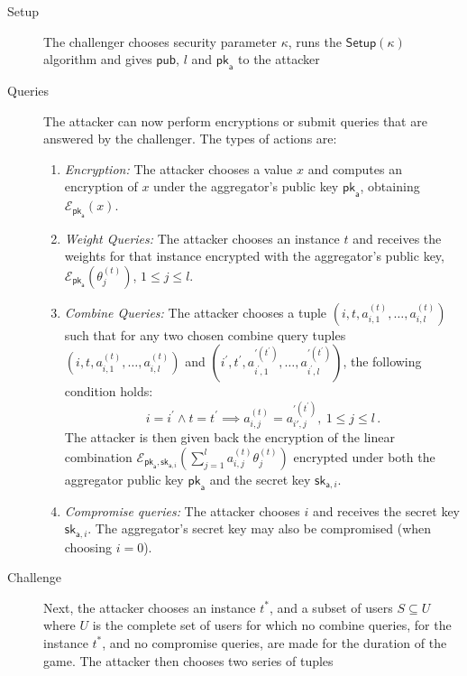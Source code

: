 \begin{description}
    \item[Setup] The challenger chooses security parameter $\kappa$, runs the $\mathsf{Setup}(\kappa)$ algorithm and gives $\mathsf{pub}$, $l$ and $\mathsf{pk}_{\mathsf{a}}$ to the attacker
    \item[Queries] The attacker can now perform encryptions or submit queries that are answered by the challenger. The types of actions are:
    \begin{enumerate}
        \item \textit{Encryption:} The attacker chooses a value $x$ and computes an encryption of $x$ under the aggregator's public key $\mathsf{pk}_{\mathsf{a}}$, obtaining $\mathcal{E}_{\mathsf{pk}_{\mathsf{a}}}(x)$.
        \item \textit{Weight Queries:} The attacker chooses an instance $t$ and receives the weights for that instance encrypted with the aggregator's public key, $\mathcal{E}_{\mathsf{pk}_{\mathsf{a}}}(\theta^{(t)}_{j})$, $1\leq j\leq l$.
        \item \textit{Combine Queries:} The attacker chooses a tuple $(i,t,a^{(t)}_{i,1},\dots,a^{(t)}_{i,l})$ such that for any two chosen combine query tuples $(i,t,a^{(t)}_{i,1},\dots,a^{(t)}_{i,l})$ and $(i^\prime,t^\prime,a^{\prime(t^\prime)}_{i^\prime,1},\dots,a^{\prime(t^\prime)}_{i^\prime,l})$, the following condition holds:
        \begin{equation*}
            i = i^\prime \wedge t = t^\prime \implies a^{(t)}_{i,j} = a^{\prime(t^\prime)}_{i',j},\ 1\leq j\leq l\,.
        \end{equation*}
        The attacker is then given back the encryption of the linear combination $\mathcal{E}_{\mathsf{pk}_{\mathsf{a}},\mathsf{sk}_{\mathsf{a}, i}}(\sum^l_{j=1}a^{(t)}_{i,j}\theta^{(t)}_j)$ encrypted under both the aggregator public key $\mathsf{pk}_{\mathsf{a}}$ and the secret key $\mathsf{sk}_{\mathsf{a}, i}$.
        \item \textit{Compromise queries:} The attacker chooses $i$ and receives the secret key $\mathsf{sk}_{\mathsf{a}, i}$. The aggregator's secret key may also be compromised (when choosing $i=0$).
    \end{enumerate} 
    \item[Challenge] Next, the attacker chooses an instance $t^*$, and a subset of users $S \subseteq U$ where $U$ is the complete set of users for which no combine queries, for the instance $t^*$, and no compromise queries, are made for the duration of the game. The attacker then chooses two series of tuples

\end{description}
